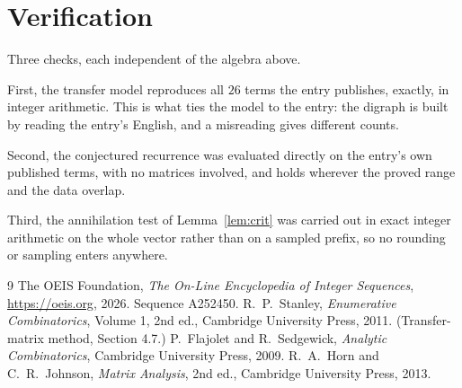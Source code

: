 \documentclass[11pt,a4paper]{article}
\theoremstyle{plain}
\theoremstyle{definition}
\begin{document}
\section{Verification}

Three checks, each independent of the algebra above.

First, the transfer model reproduces all $26$ terms the entry publishes, exactly, in
integer arithmetic. This is what ties the model to the entry: the digraph is built by reading
the entry's English, and a misreading gives different counts.

Second, the conjectured recurrence was evaluated directly on the entry's own published terms,
with no matrices involved, and holds wherever the proved range and the data overlap.

Third, the annihilation test of Lemma~\ref{lem:crit} was carried out in exact integer
arithmetic on the whole vector rather than on a sampled prefix, so no rounding or sampling
enters anywhere.

\begin{thebibliography}{9}
 The OEIS Foundation, \emph{The On-Line Encyclopedia of Integer
Sequences}, \url{https://oeis.org}, 2026. Sequence A252450.
 R.~P.~Stanley, \emph{Enumerative Combinatorics}, Volume 1, 2nd ed.,
Cambridge University Press, 2011. (Transfer-matrix method, Section 4.7.)
 P.~Flajolet and R.~Sedgewick, \emph{Analytic Combinatorics}, Cambridge
University Press, 2009.
 R.~A.~Horn and C.~R.~Johnson, \emph{Matrix Analysis}, 2nd ed., Cambridge
University Press, 2013.
\end{thebibliography}
\end{document}
